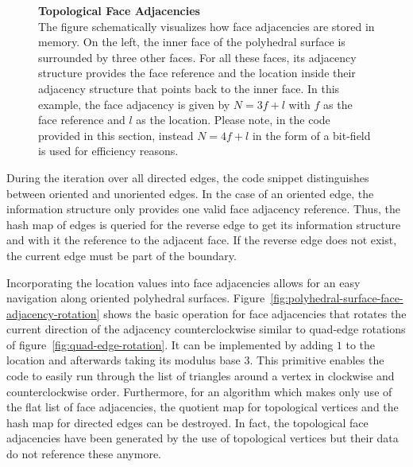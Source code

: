 \documentclass{stdlocal}
\begin{document}
\begin{figure}
\begin{subfigure}[c]{0.60\linewidth}
    \end{subfigure}
    \caption[Topological Face Adjacencies]{
      \textbf{Topological Face Adjacencies}\\
      The figure schematically visualizes how face adjacencies are stored in memory.
      On the left, the inner face of the polyhedral surface is surrounded by three other faces.
      For all these faces, its adjacency structure provides the face reference and the location inside their adjacency structure that points back to the inner face.
      In this example, the face adjacency is given by $N = 3f + l$ with $f$ as the face reference and $l$ as the location.
      Please note, in the code provided in this section, instead $N = 4f + l$ in the form of a bit-field is used for efficiency reasons.
    }
    \label{fig:polyhedral-surface-face-adjacencies}
  \end{figure}

  During the iteration over all directed edges, the code snippet distinguishes between oriented and unoriented edges.
  In the case of an oriented edge, the information structure only provides one valid face adjacency reference.
  Thus, the hash map of edges is queried for the reverse edge to get its information structure and with it the reference to the adjacent face.
  If the reverse edge does not exist, the current edge must be part of the boundary.

  Incorporating the location values into face adjacencies allows for an easy navigation along oriented polyhedral surfaces.
  Figure~\ref{fig:polyhedral-surface-face-adjacency-rotation} shows the basic operation for face adjacencies that rotates the current direction of the adjacency counterclockwise similar to quad-edge rotations of figure~\ref{fig:quad-edge-rotation}.
  It can be implemented by adding $1$ to the location and afterwards taking its modulus base $3$.
  This primitive enables the code to easily run through the list of triangles around a vertex in clockwise and counterclockwise order.
  Furthermore, for an algorithm which makes only use of the flat list of face adjacencies, the quotient map for topological vertices and the hash map for directed edges can be destroyed.
  In fact, the topological face adjacencies have been generated by the use of topological vertices but their data do not reference these anymore.
\end{document}
